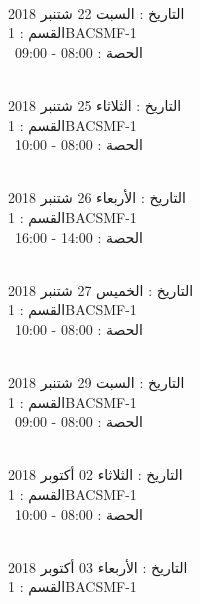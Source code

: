 \noindent\makebox[\linewidth]{\rule{\paperwidth}{0.4pt}}
 \\
التاريخ : السبت 22 شتنبر 2018 \\
القسم : 1BACSMF-1 \\
 \  
الحصة : 08:00 - 09:00 \\
\par
\noindent\makebox[\linewidth]{\rule{\paperwidth}{0.4pt}}
 \\
التاريخ : الثلاثاء 25 شتنبر 2018 \\
القسم : 1BACSMF-1 \\
 \  
الحصة : 08:00 - 10:00 \\
\par
\noindent\makebox[\linewidth]{\rule{\paperwidth}{0.4pt}}
 \\
التاريخ : الأربعاء 26 شتنبر 2018 \\
القسم : 1BACSMF-1 \\
 \  
الحصة : 14:00 - 16:00 \\
\par
\noindent\makebox[\linewidth]{\rule{\paperwidth}{0.4pt}}
 \\
التاريخ : الخميس 27 شتنبر 2018 \\
القسم : 1BACSMF-1 \\
 \  
الحصة : 08:00 - 10:00 \\
\par
\noindent\makebox[\linewidth]{\rule{\paperwidth}{0.4pt}}
 \\
التاريخ : السبت 29 شتنبر 2018 \\
القسم : 1BACSMF-1 \\
 \  
الحصة : 08:00 - 09:00 \\
\par
\noindent\makebox[\linewidth]{\rule{\paperwidth}{0.4pt}}
 \\
التاريخ : الثلاثاء 02 أكتوبر 2018 \\
القسم : 1BACSMF-1 \\
 \  
الحصة : 08:00 - 10:00 \\
\par
\noindent\makebox[\linewidth]{\rule{\paperwidth}{0.4pt}}
 \\
التاريخ : الأربعاء 03 أكتوبر 2018 \\
القسم : 1BACSMF-1 \\
